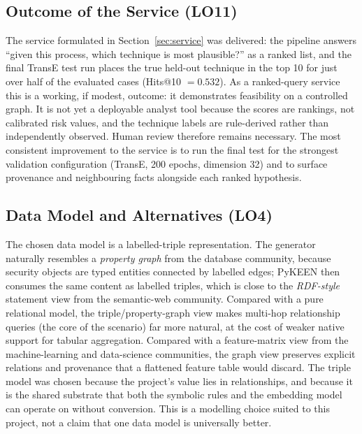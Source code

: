 \documentclass{article}
\begin{document}
\subsection{Outcome of the Service (LO11)}
\label{sec:outcome}
The service formulated in Section~\ref{sec:service} was delivered: the
pipeline answers ``given this process, which technique is most plausible?'' as
a ranked list, and the final TransE test run places the true held-out
technique in the top 10 for just over half of the evaluated cases (Hits@10
$= 0.532$). As a ranked-query service this is a working, if modest, outcome:
it demonstrates feasibility on a controlled graph. It is not yet a deployable
analyst tool because the scores are rankings, not calibrated risk values, and
the technique labels are rule-derived rather than independently observed.
Human review therefore remains necessary. The most consistent improvement to
the service is to run the final test for the strongest validation
configuration (TransE, 200 epochs, dimension 32) and to surface provenance and
neighbouring facts alongside each ranked hypothesis.

\subsection{Data Model and Alternatives (LO4)}
\label{sec:data-model}
The chosen data model is a labelled-triple representation. The generator
naturally resembles a \emph{property graph} from the database community,
because security objects are typed entities connected by labelled edges;
PyKEEN then consumes the same content as labelled triples, which is close to
the \emph{RDF-style} statement view from the semantic-web community. Compared
with a pure relational model, the triple/property-graph view makes multi-hop
relationship queries (the core of the scenario) far more natural, at the cost
of weaker native support for tabular aggregation. Compared with a
feature-matrix view from the machine-learning and data-science communities,
the graph view preserves explicit relations and provenance that a flattened
feature table would discard. The triple model was chosen because the project's
value lies in relationships, and because it is the shared substrate that both
the symbolic rules and the embedding model can operate on without conversion.
This is a modelling choice suited to this project, not a claim that one data
model is universally better.
\end{document}
